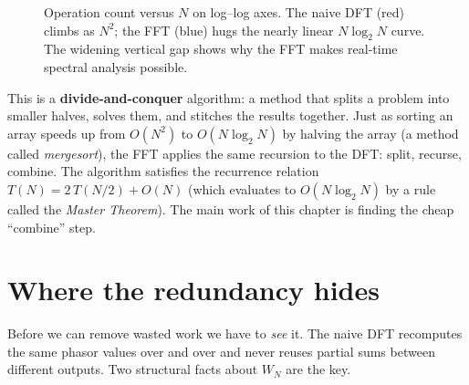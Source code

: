 \begin{figure}[H]
\centering
{}
\caption{Operation count versus $N$ on log--log axes. The naive DFT (red) climbs as $N^2$; the FFT (blue) hugs the nearly linear $N\log_2 N$ curve. The widening vertical gap shows why the FFT makes real-time spectral analysis possible.}
\label{ch09:fig-growth}
\end{figure}

\begin{connectionbox}
This is a \textbf{divide-and-conquer} algorithm: a method that splits a problem into smaller halves, solves them, and stitches the results together. Just as sorting an array speeds up from $O(N^2)$ to $O(N\log_2 N)$ by halving the array (a method called \emph{mergesort}), the FFT applies the same recursion to the DFT: split, recurse, combine. The algorithm satisfies the recurrence relation $T(N) = 2\,T(N/2) + O(N)$ (which evaluates to $O(N\log_2 N)$ by a rule called the \emph{Master Theorem}). The main work of this chapter is finding the cheap
``combine'' step.
\end{connectionbox}

\section{Where the redundancy hides}
\label{ch09:redundancy}

Before we can remove wasted work we have to \emph{see} it. The naive DFT recomputes the
same phasor values over and over and never reuses partial sums between different outputs.
Two structural facts about $W_N$ are the key.

